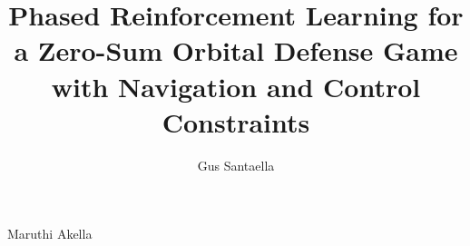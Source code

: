 \author{Gus Santaella}  	%

\address{gussantaella@utexas.edu}  %

\title{Phased Reinforcement Learning for a Zero-Sum Orbital Defense Game with Navigation and Control Constraints} %


%
%
%
%
%
%
\supervisor
	{Maruthi Akella}

%
%
%
%
%
%

